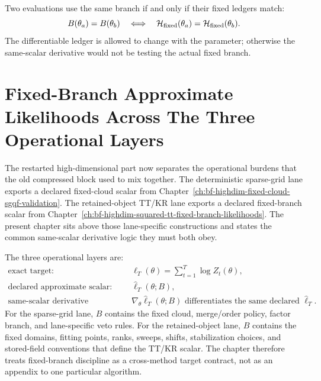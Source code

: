 Two evaluations use the same branch if and only if their fixed ledgers match:
\begin{equation}
  B(\theta_a)=B(\theta_b)
  \quad\Longleftrightarrow\quad
  \mathcal H_{\rm fixed}(\theta_a)=\mathcal H_{\rm fixed}(\theta_b).
  \label{eq:bf-hd-branch-equality}
\end{equation}
The differentiable ledger is allowed to change with the parameter; otherwise the
same-scalar derivative would not be testing the actual fixed branch.

\section{Fixed-Branch Approximate Likelihoods Across The Three Operational Layers}
\label{sec:bf-hd-fixed-branch-likelihoods}

The restarted high-dimensional part now separates the operational burdens that
the old compressed block used to mix together.  The deterministic sparse-grid
lane exports a declared fixed-cloud scalar from
Chapter~\ref{ch:bf-highdim-fixed-cloud-sgqf-validation}.  The retained-object
TT/KR lane exports a declared fixed-branch scalar from
Chapter~\ref{ch:bf-highdim-squared-tt-fixed-branch-likelihoods}.  The present
chapter sits above those lane-specific constructions and states the common
same-scalar derivative logic they must both obey.

The three operational layers are:
\begin{equation}
\begin{aligned}
  \text{exact target:}&\quad \ell_T(\theta)=\sum_{t=1}^T\log Z_t(\theta),\\
  \text{declared approximate scalar:}&\quad \widehat\ell_T(\theta;B),\\
  \text{same-scalar derivative requirement:}&\quad
  \nabla_\theta \widehat\ell_T(\theta;B)
  \text{ differentiates the same declared } \widehat\ell_T.
\end{aligned}
  \label{eq:bf-hd-fixed-branch-three-layer}
\end{equation}
For the sparse-grid lane, \(B\) contains the fixed cloud, merge/order policy,
factor branch, and lane-specific veto rules.  For the retained-object lane,
\(B\) contains the fixed domains, fitting points, ranks, sweeps, shifts,
stabilization choices, and stored-field conventions that define the TT/KR scalar.
The chapter therefore treats fixed-branch discipline as a cross-method target
contract, not as an appendix to one particular algorithm.

